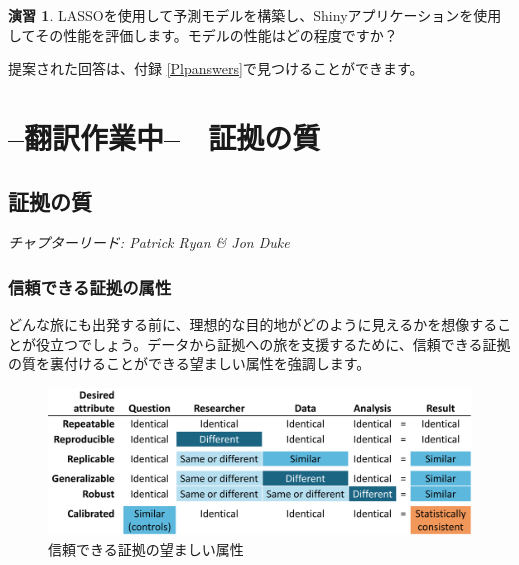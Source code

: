\documentclass[
  11pt]{book}
\theoremstyle{definition}
\theoremstyle{definition}
\theoremstyle{definition}
\newtheorem{exercise}{演習}[chapter]
\theoremstyle{definition}
\theoremstyle{remark}
\begin{document}
\begin{exercise}
\protect\hypertarget{exr:exercisePlp3}{}\label{exr:exercisePlp3}LASSOを使用して予測モデルを構築し、Shinyアプリケーションを使用してその性能を評価します。モデルの性能はどの程度ですか？
\end{exercise}

提案された回答は、付録 \ref{Plpanswers}で見つけることができます。

\part{--翻訳作業中--　証拠の質}\label{part-ux7ffbux8a33ux4f5cux696dux4e2d-ux8a3cux62e0ux306eux8cea}

\chapter{証拠の質}\label{EvidenceQuality}

\emph{チャプターリード: Patrick Ryan \& Jon Duke}


\section{信頼できる証拠の属性}\label{ux4fe1ux983cux3067ux304dux308bux8a3cux62e0ux306eux5c5eux6027}

どんな旅にも出発する前に、理想的な目的地がどのように見えるかを想像することが役立つでしょう。データから証拠への旅を支援するために、信頼できる証拠の質を裏付けることができる望ましい属性を強調します。

\begin{figure}

{\centering \includegraphics[width=1\linewidth]{images/EvidenceQuality/reliableevidenceattributes} 

}

\caption{信頼できる証拠の望ましい属性}\label{fig:attributesOfEvidence}
\end{figure}
\end{document}
